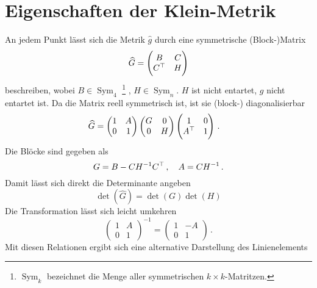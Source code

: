 \section{Eigenschaften der Klein-Metrik}
An jedem Punkt lässt sich die Metrik $\hat{g}$ durch eine symmetrische
(Block-)Matrix
\begin{equation}
\widehat{G}=\begin{pmatrix}B& C\\
C^\top& H\end{pmatrix}
\end{equation}
beschreiben, wobei
$B\in\operatorname{Sym}_4$
\footnote{$\operatorname{Sym}_k$ bezeichnet die Menge aller symmetrischen
$k\times k$-Matritzen.} , $H\in\operatorname{Sym}_n$.
$H$ ist nicht entartet, $g$ nicht entartet ist. 
Da die Matrix reell symmetrisch ist, ist sie (block-) diagonalisierbar
\begin{equation}
\begin{split}
\widehat{G}
&=
\begin{pmatrix}1& A\\0& 1\end{pmatrix}
\begin{pmatrix}G& 0\\0& H
\end{pmatrix}
\begin{pmatrix}1& 0\\A^\top& 1\end{pmatrix}\,.
\end{split}
\end{equation}
Die Blöcke sind gegeben als
\begin{equation}
G=B-CH^{-1}C^\top\,,\quad A=CH^{-1}\,.
\end{equation}
Damit lässt sich direkt die Determinante angeben
\begin{equation}
\det(\hat{G})=\det(G)\det(H)
\end{equation}
Die Transformation lässt sich leicht umkehren
\begin{equation}
\begin{pmatrix}1& A\\0& 1\end{pmatrix}^{-1}=\begin{pmatrix}1& -A\\0&
1\end{pmatrix}\,.
\end{equation}
Mit diesen Relationen ergibt sich eine alternative Darstellung des
Linienelements
